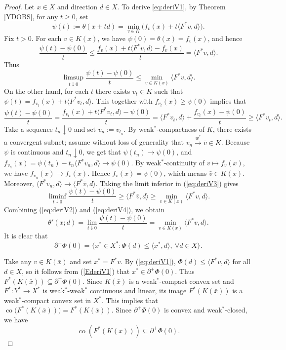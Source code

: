 \documentclass[11pt]{article}
\begin{document}
\begin{proof}   Let    $x\in X$ and direction $d\in X$.    To derive \eqref{eq:deriV1},   by  Theorem \ref{YDOBS},  for any $t \ge   0$,  set
	\[
\psi(t):=\theta(x+td)=\min_{v\in K}\bigl(f_v(x)+t\langle F^*v,d\rangle\bigr).
	\]
	Fix $t>0$. For each $v\in K(x)$, we have $\psi(0)=\theta(x)=f_v(x)$, and hence
	\[
	\frac{\psi(t)-\psi(0)}{t}\le\frac{f_v(x)+t\langle F^*v,d\rangle-f_v(x)}{t}=\langle F^*v,d\rangle .
	\]
	Thus
	\begin{equation}\label{eq:deriV2}
		\limsup_{t\downarrow0}\frac{\psi(t)-\psi(0)}{t}\le\min_{v\in K(x)}\langle F^*v,d\rangle .
	\end{equation}
	On the other hand, for each $t$ there exists $v_t\in K$ such that $\psi(t)= f_{v_t}(x)+t\langle F^*v_t,d\rangle$. This together with  $f_{v_t}(x)\ge  \psi(0)$  implies that
	\begin{equation}\label{eq:deriV3}
	\frac{\psi(t)-\psi(0)}{t}
	= \frac{f_{v_t}(x)+t\langle F^*v_t,d\rangle- \psi(0)}{t}
	= \langle F^*v_t,d\rangle +\frac{f_{v_t}(x)- \psi(0)}{t}  \ge  \langle F^*v_t,d\rangle.
		\end{equation}
 	Take a sequence $t_n\downarrow0$ and set $v_n:=v_{t_n}$. By weak$^*$-compactness of $K$, there exists a convergent subnet; assume without loss of generality that $v_n\xrightarrow{w^*} \bar v\in K$. Because $\psi$ is continuous and $t_n\downarrow0$,  we get that   $\psi (t_n)\to \psi (0)$, and
	$f_{v_n}(x)= \psi (t_n)-t_n\langle F^*v_n,d\rangle\to \psi(0)$.
	By weak$^*$-continuity of $v\mapsto f_v(x)$, we have $f_{v_n}(x) \to f_{\bar v}(x)$. Hence
	$f_{\bar v}(x)= \psi(0)$, which means $\bar v\in K(x)$. Moreover, $\langle F^*v_n,d\rangle\to\langle F^*\bar v,d\rangle$. Taking the limit inferior in (\ref{eq:deriV3}) gives
	\begin{equation}\label{eq:deriV4}
		\liminf_{t\downarrow0}\frac{\psi(t)- \psi(0)}{t}\ge\langle F^*\bar v,d\rangle\ge\min_{v\in K(x)}\langle F^*v,d\rangle .
	\end{equation}
	Combining (\ref{eq:deriV2}) and (\ref{eq:deriV4}), we obtain
	\[
	\theta'(x;d)= \lim_{t\downarrow0} \frac{\psi (t)- \psi(0)}{t} = \min_{v\in K(x)}\langle F^*v,d\rangle .
	\]
	It is clear that 
\begin{equation}\label{EderiV1}
	\partial^+ \Phi(0) = \{ x^* \in X^* : \Phi(d) \le \langle x^*, d \rangle,\ \forall d \in X \}.
	\end{equation}
	
	Take any $v \in K(\bar{x})$ and set $x^* = F^*v$. By (\ref{eq:deriV1}), $\Phi(d) \le \langle F^*v, d \rangle$ for all $d \in X$, so  it follows from  (\ref{EderiV1})  that     $x^* \in \partial^+ \Phi(0)$. Thus $F^*(K(\bar{x})) \subseteq \partial^+ \Phi(0)$. Since $K(\bar{x})$ is a weak$^*$-compact convex set and $F^*: Y^* \to X^*$ is weak$^*$-weak$^*$ continuous and linear, its image $F^*(K(\bar{x}))$ is a weak$^*$-compact convex set in $X^*$.   This implies   that  $ \operatorname{co}\bigl(F^*(K(\bar{x}))\bigr) = F^*(K(\bar{x}))$.
	Since	  $\partial^+ \Phi(0)$ is   convex and weak$^*$-closed,  we have
\begin{equation}\label{EderiV2}
	\operatorname{co}(F^*(K(\bar{x}))) \subseteq \partial^+ \Phi(0).
	\end{equation}
	

\end{proof}
\end{document}
